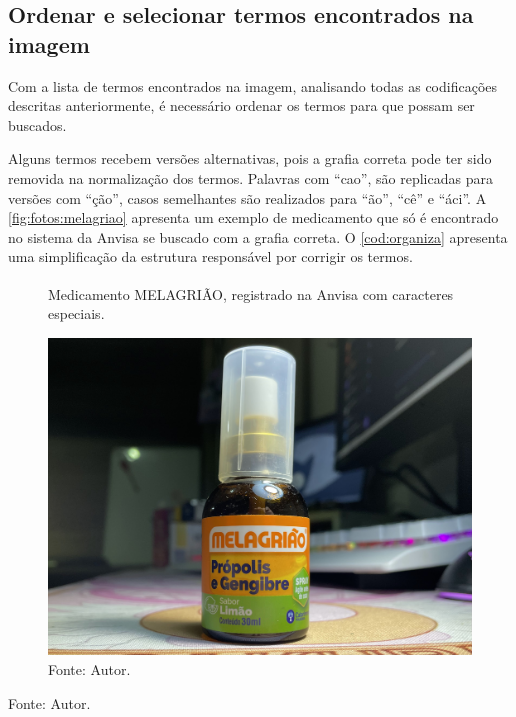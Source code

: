 \subsection{Ordenar e selecionar termos encontrados na imagem}\label{ssec:organizar}

Com a lista de termos encontrados na imagem, analisando todas as codificações descritas anteriormente, é necessário ordenar os termos para que possam ser buscados.

Alguns termos recebem versões alternativas, pois a grafia correta pode ter sido removida na normalização dos termos.
Palavras com ``cao'', são replicadas para versões com ``ção'', casos semelhantes são realizados para ``ão'', ``cê'' e ``áci''.
A \autoref{fig:fotos:melagriao} apresenta um exemplo de medicamento que só é encontrado no sistema da \ac{Anvisa} se buscado com a grafia correta.
O \autoref{cod:organiza} apresenta uma simplificação da estrutura responsável por corrigir os termos.

\begin{figure}[htb]
    \centering
    \caption{Medicamento MELAGRIÃO\textsuperscript{\tiny\textregistered}, registrado na \ac{Anvisa} com caracteres especiais.}
    \label{fig:fotos:melagriao}
    \includegraphics[width=0.45\linewidth]{../pictures/melagriao.jpg}
    \caption*{Fonte: Autor.}
\end{figure}


\begin{lstfloat}[htbp]
    \centering
    
    \caption*{Fonte: Autor.}
\end{lstfloat}

